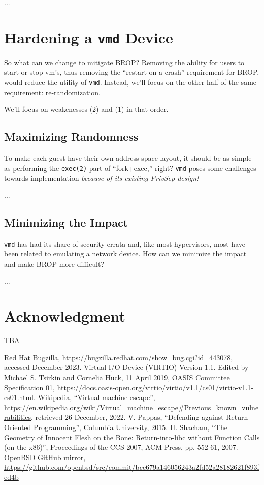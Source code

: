 \documentclass[conference]{IEEEtran}
\begin{document}
...

\section{Hardening a \texttt{vmd} Device}
So what can we change to mitigate BROP? Removing the ability for users to start or stop vm's, thus removing the ``restart on a crash'' requirement for BROP, would reduce the utility of \texttt{vmd}. Instead, we'll focus on the other half of the same requirement: re-randomization.

We'll focus on weakenesses (2) and (1) in that order.

\subsection{Maximizing Randomness}
To make each guest have their own address space layout, it should be
as simple as performing the \texttt{exec(2)} part of ``fork+exec,''
right? \texttt{vmd} poses some challenges towards implementation \emph{because of its existing PrivSep design!}

...

\subsection{Minimizing the Impact}
\texttt{vmd} has had its share of security errata and, like most
hypervisors, most have been related to emulating a network device. How
can we minimize the impact and make BROP more difficult?

...


\section*{Acknowledgment}

TBA

\begin{thebibliography}{00}
 Red Hat Bugzilla, \url{https://bugzilla.redhat.com/show_bug.cgi?id=443078}, accessed December 2023.
 Virtual I/O Device (VIRTIO) Version 1.1. Edited by Michael S. Tsirkin and Cornelia Huck, 11 April 2019, OASIS Committee Specification 01, \url{https://docs.oasis-open.org/virtio/virtio/v1.1/cs01/virtio-v1.1-cs01.html}.
 Wikipedia, ``Virtual machine escape'', \url{https://en.wikipedia.org/wiki/Virtual_machine_escape#Previous_known_vulnerabilities}, retrieved 26 December, 2022.
   V. Pappas, ``Defending against Return-Oriented Programming'', Columbia University, 2015.
 H. Shacham, ``The Geometry of Innocent Flesh on the Bone:
  Return-into-libc without Function Calls (on the x86)'', Proceedings of the CCS 2007, ACM Press, pp. 552-61, 2007.
 OpenBSD GitHub mirror, \url{https://github.com/openbsd/src/commit/bcc679a146056243a2fd52a28182621f893fed4b}
\end{thebibliography}
\end{document}
